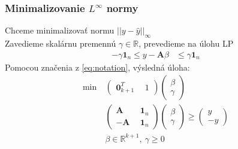 \documentclass[presentation.tex]{subfiles}
\begin{document}
	\begin{frame}[shrink=0.5]
		\frametitle{Minimalizovanie  $L^{\infty}$ normy}
		\text Chceme minimalizovať normu $||y - \hat{y}||_{\infty}$ \\
		\text Zavedieme skalárnu premennú $\gamma \in \mathbb{R}$, prevedieme na úlohu LP 
		\begin{align*}
			-\gamma \mathbf{1}_n \leq y - \mathbf{A} \beta &\leq \gamma \mathbf{1}_n
		\end{align*}
		\text Pomocou značenia z \eqref{eq:notation}, výsledná úloha:
		\begin{align*}
			\text{min}~ &
			\left(
			\begin{array}{c|c}
				\mathbf{0}_{k+1}^T ~&~ 1
			\end{array}
			\right)
			\left(
			\begin{array}{c}
				\beta \\
				\hline
				\gamma
			\end{array}
			\right) \\
			&\left(
			\begin{array}{c|c}
				\mathbf{A} ~&~ \mathbf{1}_n \\
				\hline
				-\mathbf{A} ~&~ \mathbf{1}_n
			\end{array}
			\right)
			\left(
			\begin{array}{c}
				\beta \\
				\hline
				\gamma
			\end{array}
			\right) 
			\geq
			\left(
			\begin{array}{c}
				y \\
				\hline
				-y
			\end{array}
			\right) \\
			&\beta \in \mathbb{R}^{k+1},~\gamma \geq 0 
		\end{align*}
	\end{frame}
\end{document}
